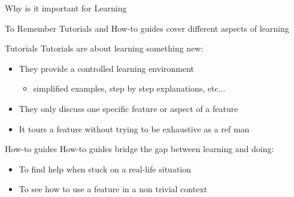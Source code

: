 \documentclass[10pt]{beamer}
\begin{document}
\begin{frame}{Why is it important for Learning}
  \vspace*{-4pt}
  \begin{tcbSol}{To Remember}
    Tutorials and How-to guides cover different aspects of learning
  \end{tcbSol}
  \vspace*{-4pt}
  \begin{tcbProp}{Tutorials}
    Tutorials are about learning something new:
    \begin{itemize}[label=$-$]
      \item They provide a controlled learning environment
      \begin{itemize}[label=$\hookrightarrow$]
        \item simplified examples, step by step explanations, etc...
      \end{itemize}
      \item They only discuss one specific feature or aspect of a feature
      \item It tours a feature without trying to be exhaustive as a ref man
    \end{itemize}
  \end{tcbProp}
  \vspace*{-4pt}
  \begin{tcbProp}{How-to guides}
    How-to guides bridge the gap between learning and doing:
    \begin{itemize}[label=$-$]
      \item To find help when stuck on a real-life situation
      \item To see how to use a feature in a non trivial context
    \end{itemize}
  \end{tcbProp}
\end{frame}
\end{document}
